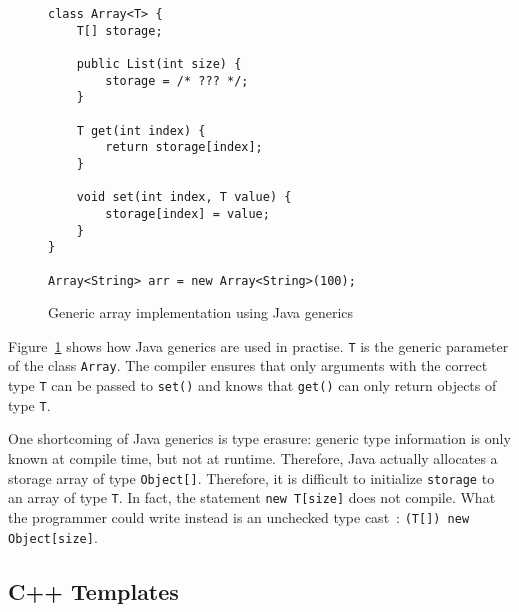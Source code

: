\begin{figure}[!htp]
\begin{lstlisting}
class Array<T> {
    T[] storage;

    public List(int size) {
        storage = /* ??? */;
    }

    T get(int index) {
        return storage[index];
    }

    void set(int index, T value) {
        storage[index] = value;
    }
}

Array<String> arr = new Array<String>(100);
\end{lstlisting}
\caption{Generic array implementation using Java generics}
\label{fig:rel_java_generics}
\end{figure}

Figure~\ref{fig:rel_java_generics} shows how Java generics are used in practise. \texttt{T} is the generic parameter of the class \texttt{Array}. The compiler ensures that only arguments with the correct type \texttt{T} can be passed to \texttt{set()} and knows that \texttt{get()} can only return objects of type \texttt{T}. 

One shortcoming of Java generics is type erasure: generic type information is only known at compile time, but not at runtime. Therefore, Java actually allocates a storage array of type \texttt{Object[]}. Therefore, it is difficult to initialize \texttt{storage} to an array of type \texttt{T}. In fact, the statement \texttt{new T[size]} does not compile. What the programmer could write instead is an unchecked type cast~\cite{nino2007cost}: \texttt{(T[]) new Object[size]}.

\subsection{C++ Templates}